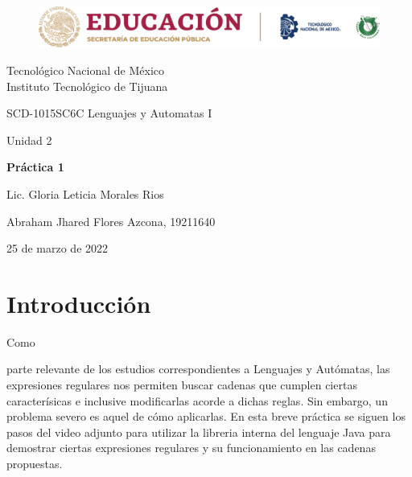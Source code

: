 \documentclass[stu, 12pt, letterpaper, donotrepeattitle, floatsintext, natbib]{apa7}
\begin{document}
    \begin{titlepage}
        \begin{figure}[ht]
            \centering
            \includegraphics[width=15cm]{logosITT.png}
        \end{figure}
        \centering
        {\Large Tecnológico Nacional de México\\Instituto Tecnológico de Tijuana\par}
        \vspace{1cm}
        {\Large SCD-1015SC6C Lenguajes y Automatas I\par}
        \vspace{1cm}
        {\Large Unidad 2\par}
        \vspace{1.5cm}
        {\Large\bfseries Práctica 1\par}
        \vspace{2cm}
        {\large Lic. Gloria Leticia Morales Rios\par}
        \vfill
            {\large Abraham Jhared Flores Azcona, 19211640\par}
        \vfill
        {\large 25 de marzo de 2022}
    \end{titlepage}

\renewcommand\contentsname{Contenido}
\tableofcontents

\newpage
\section{Introducción}
Como \begin{justifying}
    parte relevante de los estudios correspondientes a Lenguajes y Autómatas,
    las expresiones regulares nos permiten buscar cadenas que cumplen ciertas
    caracterísicas e inclusive modificarlas acorde a dichas reglas. Sin embargo,
    un problema severo es aquel de cómo aplicarlas. En esta breve práctica se
    siguen los pasos del video adjunto para utilizar la libreria interna del
    lenguaje Java para demostrar ciertas expresiones regulares y su funcionamiento
    en las cadenas propuestas.
    \end{justifying}
\vspace{\baselineskip}
\end{document}
